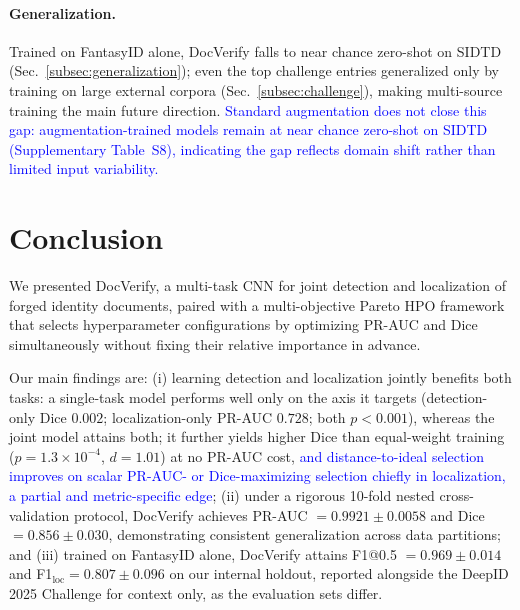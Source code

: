 \documentclass[final,5p,times,twocolumn,number]{elsarticle}
\newcommand{\rev}[1]{#1}
\newcommand{\revB}[1]{\textcolor{blue}{#1}}
\begin{document}
\paragraph{\rev{Generalization.}}
\rev{Trained on FantasyID alone, DocVerify falls to near chance zero-shot on SIDTD
(Sec.~\ref{subsec:generalization}); even the top challenge entries generalized
only by training on large external corpora (Sec.~\ref{subsec:challenge}), making
multi-source training the main future direction.} \revB{Standard augmentation does
not close this gap: augmentation-trained models remain at near chance zero-shot on
SIDTD (Supplementary Table~S8), indicating the gap reflects domain shift rather
than limited input variability.}


\section{Conclusion}
\label{sec:conclusion}

We presented DocVerify, a multi-task CNN for joint detection and localization of
forged identity documents, paired with a multi-objective Pareto HPO framework
that selects hyperparameter configurations by optimizing PR-AUC and Dice
simultaneously without fixing their relative importance in advance.

Our main findings are: \rev{(i) learning detection and localization jointly
benefits both tasks: a single-task model performs well only on the axis it
targets (detection-only Dice $0.002$; localization-only PR-AUC $0.728$; both
$p < 0.001$), whereas the joint model attains both; it further yields higher
Dice than equal-weight training ($p = 1.3 \times 10^{-4}$, $d = 1.01$) at no
PR-AUC cost,} \revB{and distance-to-ideal selection improves on scalar PR-AUC- or
Dice-maximizing selection chiefly in localization, a partial and metric-specific
edge}; (ii) under a rigorous 10-fold
nested cross-validation protocol, DocVerify achieves PR-AUC $= 0.9921 \pm
0.0058$ and Dice $= 0.856 \pm 0.030$, demonstrating consistent generalization
across data partitions; and \rev{(iii) trained on FantasyID alone, DocVerify
attains F1@0.5 $= 0.969 \pm 0.014$ and F1$_{\text{loc}} = 0.807 \pm 0.096$ on our
internal holdout, reported alongside the DeepID 2025 Challenge for context only,
as the evaluation sets differ.}
\end{document}
